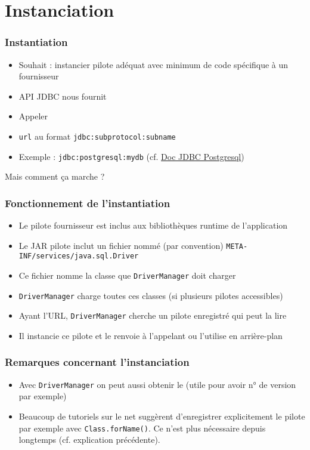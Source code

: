 \documentclass[english, french]{beamer}
\begin{document}
\section{Instanciation}
\begin{frame}
	\frametitle{Instantiation}
	\begin{itemize}
		\item Souhait : instancier pilote adéquat avec minimum de code spécifique à un fournisseur
		\item API JDBC nous fournit 
		\item Appeler \texttt{}
		\item \texttt{url} au format \texttt{jdbc:subprotocol:subname}
		\item Exemple : \texttt{jdbc:postgresql:mydb} (cf. \href{https://jdbc.postgresql.org/documentation/head/connect.html}{Doc JDBC Postgresql})
	\end{itemize}
	Mais comment ça marche ?
\end{frame}

\begin{frame}
	\frametitle{Fonctionnement de l’instantiation}
	\begin{itemize}
		\item Le pilote fournisseur est inclus aux bibliothèques runtime de l’application
		\item Le JAR pilote inclut un fichier nommé (par convention) \texttt{META-INF/services/java.sql.Driver}
		\item Ce fichier nomme la classe que \texttt{DriverManager} doit charger
		\item \texttt{DriverManager} charge toutes ces classes (si plusieurs pilotes accessibles)
		\item Ayant l’URL, \texttt{DriverManager} cherche un pilote enregistré qui peut la lire
		\item Il instancie ce pilote et le renvoie à l’appelant ou l’utilise en arrière-plan
	\end{itemize}
	
\end{frame}

\begin{frame}
	\frametitle{Remarques concernant l’instanciation}
	\begin{itemize}
		\item Avec \texttt{DriverManager} on peut aussi obtenir le  (utile pour avoir n° de version par exemple)
		\item Beaucoup de tutoriels sur le net suggèrent d’enregistrer explicitement le pilote {\tiny par exemple avec \texttt{Class.forName()}}. Ce n’est plus nécessaire depuis longtemps (cf. explication précédente).
	\end{itemize}
\end{frame}
\end{document}
